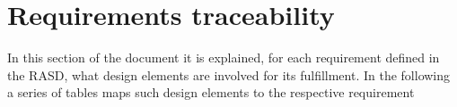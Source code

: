 \section{Requirements traceability}
In this section of the document it is explained, for each requirement defined in the RASD,
what design elements are involved for its fulfillment. In the following a series of tables maps
such design elements to the respective requirement